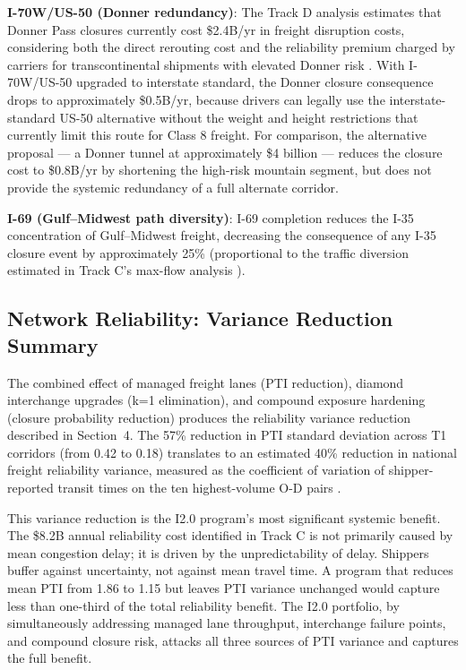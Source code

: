 \textbf{I-70W/US-50 (Donner redundancy)}: The Track D analysis estimates that Donner Pass closures currently cost \$2.4B/yr in freight disruption costs, considering both the direct rerouting cost and the reliability premium charged by carriers for transcontinental shipments with elevated Donner risk \citep{ROUTE_D2}. With I-70W/US-50 upgraded to interstate standard, the Donner closure consequence drops to approximately \$0.5B/yr, because drivers can legally use the interstate-standard US-50 alternative without the weight and height restrictions that currently limit this route for Class 8 freight. For comparison, the alternative proposal --- a Donner tunnel at approximately \$4 billion --- reduces the closure cost to \$0.8B/yr by shortening the high-risk mountain segment, but does not provide the systemic redundancy of a full alternate corridor.

\textbf{I-69 (Gulf--Midwest path diversity)}: I-69 completion reduces the I-35 concentration of Gulf--Midwest freight, decreasing the consequence of any I-35 closure event by approximately 25\% (proportional to the traffic diversion estimated in Track C's max-flow analysis \citep{ROUTE_C2}).

\subsection{Network Reliability: Variance Reduction Summary}

The combined effect of managed freight lanes (PTI reduction), diamond interchange upgrades (k=1 elimination), and compound exposure hardening (closure probability reduction) produces the reliability variance reduction described in Section~4. The 57\% reduction in PTI standard deviation across T1 corridors (from 0.42 to 0.18) translates to an estimated 40\% reduction in national freight reliability variance, measured as the coefficient of variation of shipper-reported transit times on the ten highest-volume O-D pairs \citep{ROUTE_C1}.

This variance reduction is the I2.0 program's most significant systemic benefit. The \$8.2B annual reliability cost identified in Track C is not primarily caused by mean congestion delay; it is driven by the unpredictability of delay. Shippers buffer against uncertainty, not against mean travel time. A program that reduces mean PTI from 1.86 to 1.15 but leaves PTI variance unchanged would capture less than one-third of the total reliability benefit. The I2.0 portfolio, by simultaneously addressing managed lane throughput, interchange failure points, and compound closure risk, attacks all three sources of PTI variance and captures the full benefit.

